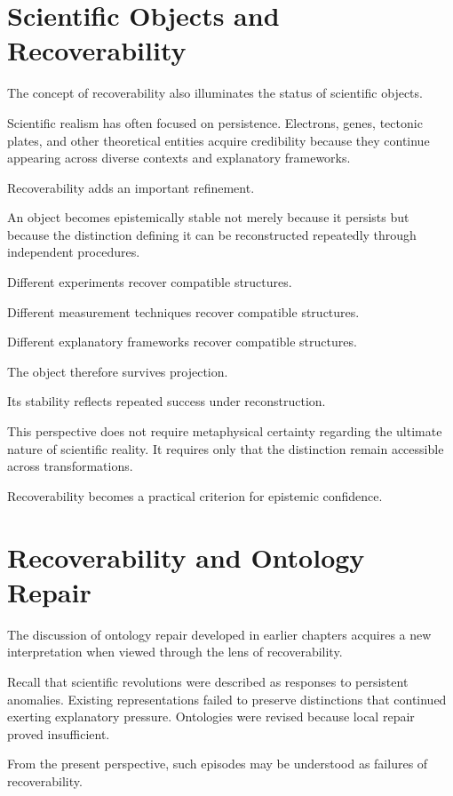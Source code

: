 \documentclass[11pt,oneside,openany]{book}
\begin{document}
\section{Scientific Objects and Recoverability}

The concept of recoverability also illuminates the status of scientific objects.

Scientific realism has often focused on persistence. Electrons, genes, tectonic plates, and other theoretical entities acquire credibility because they continue appearing across diverse contexts and explanatory frameworks.

Recoverability adds an important refinement.

An object becomes epistemically stable not merely because it persists but because the distinction defining it can be reconstructed repeatedly through independent procedures.

Different experiments recover compatible structures.

Different measurement techniques recover compatible structures.

Different explanatory frameworks recover compatible structures.

The object therefore survives projection.

Its stability reflects repeated success under reconstruction.

This perspective does not require metaphysical certainty regarding the ultimate nature of scientific reality. It requires only that the distinction remain accessible across transformations.

Recoverability becomes a practical criterion for epistemic confidence.

\section{Recoverability and Ontology Repair}

The discussion of ontology repair developed in earlier chapters acquires a new interpretation when viewed through the lens of recoverability.

Recall that scientific revolutions were described as responses to persistent anomalies. Existing representations failed to preserve distinctions that continued exerting explanatory pressure. Ontologies were revised because local repair proved insufficient.

From the present perspective, such episodes may be understood as failures of recoverability.
\end{document}
